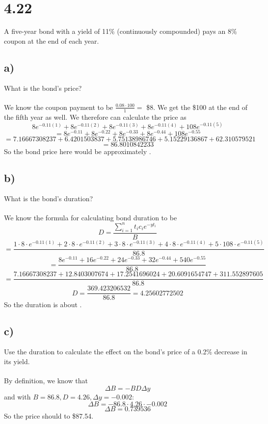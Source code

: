 \documentclass{article}
\begin{document}
{\Large 

\section*{4.22}

A five-year bond with a yield of 11\% (continuously compounded) pays an 8\% coupon at the end of each year.

\subsection*{a)}

What is the bond's price? \\ \\
We know the coupon payment to be \(\frac{0.08 \cdot 100}{1} = \) \$8. We get the \$100 at the end of the fifth year as well. We therefore can calculate the price as 
\[
  8e^{-0.11(1)} + 8e^{-0.11(2)} + 8e^{-0.11(3)} + 8e^{-0.11(4)} + 108e^{-0.11(5)}
\]
\[
  = 8e^{-0.11} + 8e^{-0.22} + 8e^{-0.33} + 8e^{-0.44} + 108e^{-0.55}
\]
\[
  = 7.16667308237 + 6.4201503837 + 5.75138986746 + 5.15229136867 + 62.310579521
\]
\[
  = 86.8010842233
\]
So the bond price here would be approximately .

\subsection*{b)}

What is the bond's duration? \\ \\
We know the formula for calculating bond duration to be 
\[
  D = \frac{\sum_{i=1}^{n} t_i c_i e^{-yt_i}}{B}
\]
\[
  = \frac{1 \cdot 8 \cdot e^{-0.11(1)} + 2 \cdot 8 \cdot e^{-0.11(2)} + 3 \cdot 8 \cdot e^{-0.11(3)} + 4 \cdot 8 \cdot e^{-0.11(4)} + 5 \cdot 108 \cdot e^{-0.11(5)}}{86.8}
\]
\[
  = \frac{8e^{-0.11} + 16e^{-0.22} + 24e^{-0.33} + 32e^{-0.44} + 540e^{-0.55}}{86.8}
\]
\[
  = \frac{7.16667308237 + 12.8403007674 + 17.2541696024 + 20.6091654747 + 311.552897605}{86.8}
\]
\[
  D = \frac{369.423206532}{86.8} = 4.25602772502
\]
So the duration is about .

\subsection*{c)}

Use the duration to calculate the effect on the bond's price of a 0.2\% decrease in its yield. \\ \\
By definition, we know that 
\[
  \Delta B = - B D \Delta y
\]
and with \(B = 86.8, D = 4.26, \Delta y = - 0.002\):
\[
  \Delta B = - 86.8 \cdot 4.26 \cdot - 0.002
\]
\[
  \Delta B = 0.739536
\]
So the price should  to \$87.54.

}
\end{document}
